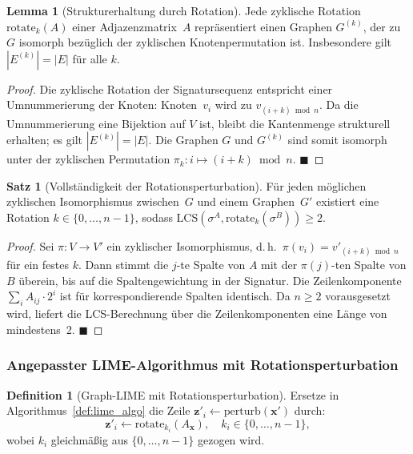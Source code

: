 ﻿\documentclass[a4paper,12pt]{article}
\theoremstyle{definition}
\newtheorem{definition}{Definition}[section]
\newtheorem{satz}{Satz}[section]
\newtheorem{lemma}{Lemma}[section]
\begin{document}
\begin{lemma}[Strukturerhaltung durch Rotation]
  \label{lem:rotation_preserves}
  Jede zyklische Rotation $\mathrm{rotate}_k(A)$ einer Adjazenzmatrix~$A$
  repräsentiert einen Graphen $G^{(k)}$, der zu $G$ isomorph bezüglich der
  zyklischen Knotenpermutation ist.
  Insbesondere gilt $|E^{(k)}| = |E|$ für alle $k$.
\end{lemma}

\begin{proof}
  Die zyklische Rotation der Signatursequenz entspricht einer Umnummerierung der
  Knoten: Knoten~$v_i$ wird zu $v_{(i+k) \bmod n}$.
  Da die Umnummerierung eine Bijektion auf $V$ ist, bleibt die Kantenmenge strukturell
  erhalten; es gilt $|E^{(k)}| = |E|$.
  Die Graphen $G$ und $G^{(k)}$ sind somit isomorph unter der zyklischen Permutation
  $\pi_k: i \mapsto (i+k) \bmod n$. \hfill$\blacksquare$
\end{proof}

\begin{satz}[Vollständigkeit der Rotationsperturbation]
  \label{satz:rotation_complete}
  Für jeden möglichen zyklischen Isomorphismus zwischen~$G$ und einem Graphen~$G'$
  existiert eine Rotation $k \in \{0, \ldots, n-1\}$, sodass
  $\mathrm{LCS}(\sigma^A, \mathrm{rotate}_k(\sigma^B)) \geq 2$.
\end{satz}

\begin{proof}
  Sei $\pi: V \to V'$ ein zyklischer Isomorphismus, d.\,h.\ $\pi(v_i) = v'_{(i+k) \bmod n}$
  für ein festes $k$.
  Dann stimmt die $j$-te Spalte von $A$ mit der $\pi(j)$-ten Spalte von $B$ überein,
  bis auf die Spaltengewichtung in der Signatur.
  Die Zeilenkomponente $\sum_i A_{ij} \cdot 2^i$ ist für korrespondierende Spalten
  identisch.
  Da $n \geq 2$ vorausgesetzt wird, liefert die LCS-Berechnung über die
  Zeilenkomponenten eine Länge von mindestens~2. \hfill$\blacksquare$
\end{proof}

\subsubsection{Angepasster LIME-Algorithmus mit Rotationsperturbation}

\begin{definition}[Graph-LIME mit Rotationsperturbation]
  Ersetze in Algorithmus~\ref{def:lime_algo} die Zeile
  $\mathbf{z}'_i \leftarrow \mathrm{perturb}(\mathbf{x}')$ durch:
  \[
    \mathbf{z}'_i \leftarrow \mathrm{rotate}_{k_i}(A_\mathbf{x}),
    \quad k_i \in \{0, \ldots, n-1\},
  \]
  wobei $k_i$ gleichmäßig aus $\{0, \ldots, n-1\}$ gezogen wird.
\end{definition}
\end{document}
